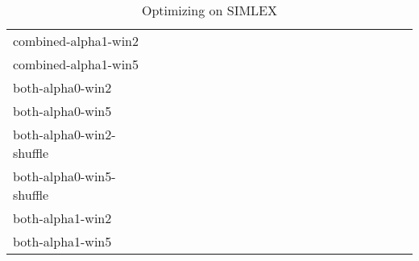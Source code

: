 \begin{table}[H]
{\begin{tabular}{l *{20}{S[table-auto-round, table-format=1.2]}}
        combined-alpha1-win2 &  \\
        combined-alpha1-win5 \\
        both-alpha0-win2 \\
        both-alpha0-win5  \\
        both-alpha0-win2-shuffle \\
        both-alpha0-win5-shuffle \\
        both-alpha1-win2 \\
        both-alpha1-win5 \\
     \bottomrule
    \end{tabular}
    }
    \caption{Optimizing on SIMLEX}
\end{table}
